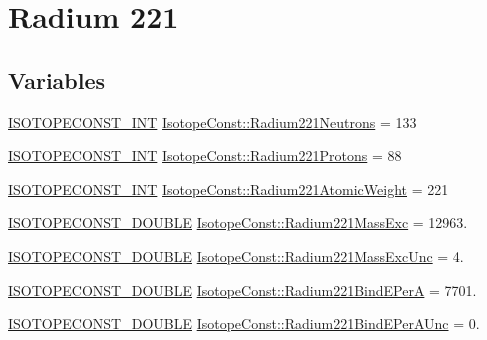 \hypertarget{group___isotope_const-_radium-_ra221}{}\section{Radium 221}
\label{group___isotope_const-_radium-_ra221}
\subsection*{Variables}
\begin{DoxyCompactItemize}
\item 
\mbox{\hyperlink{group___isotope_const-_macros_ga5f18360b3e99483a35c32d789e62621c}{I\+S\+O\+T\+O\+P\+E\+C\+O\+N\+S\+T\+\_\+\+I\+NT}} \mbox{\hyperlink{group___isotope_const-_radium-_ra221_ga614627afd57e8df955e1e40f3a305d7f}{Isotope\+Const\+::\+Radium221\+Neutrons}} = 133
\item 
\mbox{\hyperlink{group___isotope_const-_macros_ga5f18360b3e99483a35c32d789e62621c}{I\+S\+O\+T\+O\+P\+E\+C\+O\+N\+S\+T\+\_\+\+I\+NT}} \mbox{\hyperlink{group___isotope_const-_radium-_ra221_gae912326244ff0d7907f20fa09c3857f1}{Isotope\+Const\+::\+Radium221\+Protons}} = 88
\item 
\mbox{\hyperlink{group___isotope_const-_macros_ga5f18360b3e99483a35c32d789e62621c}{I\+S\+O\+T\+O\+P\+E\+C\+O\+N\+S\+T\+\_\+\+I\+NT}} \mbox{\hyperlink{group___isotope_const-_radium-_ra221_ga83f18ad5d40a12894901a81cc7a01091}{Isotope\+Const\+::\+Radium221\+Atomic\+Weight}} = 221
\item 
\mbox{\hyperlink{group___isotope_const-_macros_ga8f45a7272ce02c0b4c65c44636ed719a}{I\+S\+O\+T\+O\+P\+E\+C\+O\+N\+S\+T\+\_\+\+D\+O\+U\+B\+LE}} \mbox{\hyperlink{group___isotope_const-_radium-_ra221_ga25119678beba3d6be97f60fce7989a7b}{Isotope\+Const\+::\+Radium221\+Mass\+Exc}} = 12963.
\item 
\mbox{\hyperlink{group___isotope_const-_macros_ga8f45a7272ce02c0b4c65c44636ed719a}{I\+S\+O\+T\+O\+P\+E\+C\+O\+N\+S\+T\+\_\+\+D\+O\+U\+B\+LE}} \mbox{\hyperlink{group___isotope_const-_radium-_ra221_ga16b49567a8e2336ff61962488a3e0f58}{Isotope\+Const\+::\+Radium221\+Mass\+Exc\+Unc}} = 4.
\item 
\mbox{\hyperlink{group___isotope_const-_macros_ga8f45a7272ce02c0b4c65c44636ed719a}{I\+S\+O\+T\+O\+P\+E\+C\+O\+N\+S\+T\+\_\+\+D\+O\+U\+B\+LE}} \mbox{\hyperlink{group___isotope_const-_radium-_ra221_gaa18e4606ee685e4edb3ff4aef975ec35}{Isotope\+Const\+::\+Radium221\+Bind\+E\+PerA}} = 7701.
\item 
\mbox{\hyperlink{group___isotope_const-_macros_ga8f45a7272ce02c0b4c65c44636ed719a}{I\+S\+O\+T\+O\+P\+E\+C\+O\+N\+S\+T\+\_\+\+D\+O\+U\+B\+LE}} \mbox{\hyperlink{group___isotope_const-_radium-_ra221_gac974043531b43f830e0b09fffb31fc40}{Isotope\+Const\+::\+Radium221\+Bind\+E\+Per\+A\+Unc}} = 0.

\end{DoxyCompactItemize}
